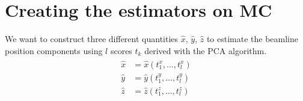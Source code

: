 \section{Creating the estimators on MC}

We want to construct three different quantities $\hat{x}$, $\hat{y}$, $\hat{z}$ to estimate the beamline position components using $l$ scores $t_k$ derived with the PCA algorithm.
\begin{align}
\begin{split}
    \hat{x} &= \hat{x}(t^x_1, \dots, t^x_l) \\
    \hat{y} &= \hat{y}(t^y_1, \dots, t^y_l) \\\label{x_hat}
    \hat{z} &= \hat{z}(t^z_1, \dots, t^z_l) 
    \end{split}
\end{align} 

